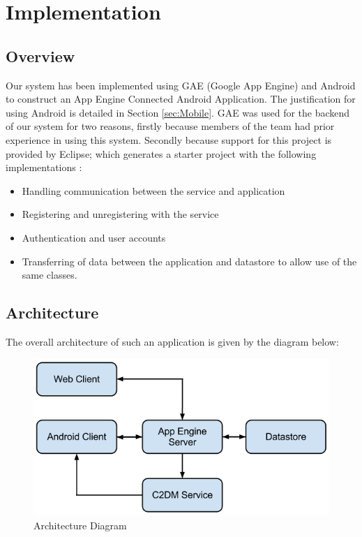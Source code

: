 \section{Implementation}

\subsection{Overview}
Our system has been implemented using GAE (Google App Engine) and Android to construct an App Engine Connected Android Application.  
The justification for using Android is detailed in Section \ref{sec:Mobile}.
GAE was used for the backend of our system for two reasons, firstly because members of the team had prior experience in using this system. 
Secondly because support for this project is provided by Eclipse; which generates a starter project with the following implementations \cite{AppEngine}:
\begin{itemize}
	\item{Handling communication between the service and application}
	\item{Registering and unregistering with the service}
	\item{Authentication and user accounts}
	\item{Transferring of data between the application and datastore to allow use of the same classes}.
\end{itemize}

\subsection{Architecture}
The overall architecture of such an application is given by the diagram below:

\begin{figure}[ht]
\begin{center}
\includegraphics[trim = 0mm 0mm 0mm 0mm, clip, scale=0.4]{images/Architecture.png}
\caption{Architecture Diagram \cite{AppEngine}} 
\end{center}
\end{figure}

